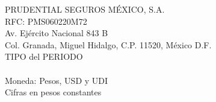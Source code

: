 PRUDENTIAL SEGUROS MÉXICO, S.A.\\
RFC: PMS060220M72\\
Av. Ejército Nacional 843 B\\
Col. Granada, Miguel Hidalgo, C.P. 11520, México D.F.\\
TIPO del PERIODO \\\ \\
Moneda: Pesos, USD y UDI\\
Cifras en pesos constantes

